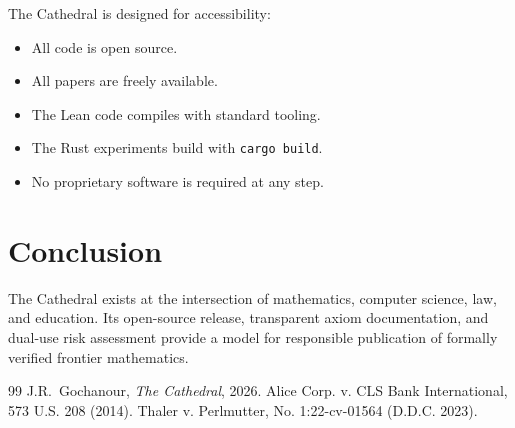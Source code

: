 \documentclass[11pt,a4paper]{article}
\begin{document}
The Cathedral is designed for accessibility:
\begin{itemize}
  \item All code is open source.
  \item All papers are freely available.
  \item The Lean code compiles with standard tooling.
  \item The Rust experiments build with \texttt{cargo build}.
  \item No proprietary software is required at any step.
\end{itemize}

\section{Conclusion}

The Cathedral exists at the intersection of mathematics, computer
science, law, and education. Its open-source release, transparent
axiom documentation, and dual-use risk assessment provide a model
for responsible publication of formally verified frontier mathematics.

\begin{thebibliography}{99}
J.R.~Gochanour, \emph{The Cathedral}, 2026.
Alice Corp. v. CLS Bank International, 573 U.S. 208 (2014).
Thaler v. Perlmutter, No. 1:22-cv-01564 (D.D.C. 2023).
\end{thebibliography}
\end{document}

